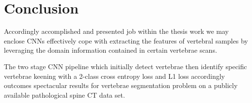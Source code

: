 \chapter{Conclusion}
\label{ch:conclusion}
Accordingly  accomplished and presented job within the thesis work we may enclose CNNs effectively cope with extracting the features of vertebral samples by leveraging the domain information contained in certain vertebrae scans.

The two stage CNN pipeline which initially detect vertebrae then identify specific vertebrae keening with a 2-class cross entropy loss  and L1 loss accordingly outcomes spectacular results for vertebrae segmentation problem on a publicly available pathological spine CT data set. 